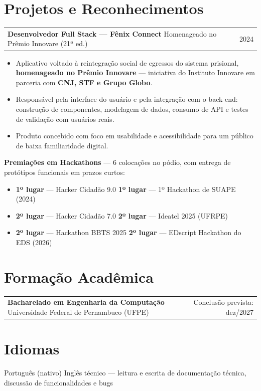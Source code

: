 \documentclass[a4paper,10.5pt]{article}
\makeatletter
\newcommand{\cargo}[3]{%
  \vspace{2pt}
  \begin{tabularx}{\textwidth}{@{}Xr@{}}
    \textbf{#1} \textnormal{\textbar{} #2} & \textcolor{muted}{#3}
  \end{tabularx}%
  \vspace{1pt}
}
\makeatother
\begin{document}
\section{Projetos e Reconhecimentos}

\cargo{Desenvolvedor Full Stack --- Fênix Connect}{Homenageado no Prêmio Innovare (21ª ed.)}{2024}
\begin{itemize}
  \item Aplicativo voltado à reintegração social de egressos do sistema prisional, \textbf{homenageado no Prêmio Innovare} --- iniciativa do Instituto Innovare em parceria com \textbf{CNJ, STF e Grupo Globo}.
  \item Responsável pela interface do usuário e pela integração com o back-end: construção de componentes, modelagem de dados, consumo de API e testes de validação com usuários reais.
  \item Produto concebido com foco em usabilidade e acessibilidade para um público de baixa familiaridade digital.
\end{itemize}

\textbf{Premiações em Hackathons} --- 6 colocações no pódio, com entrega de protótipos funcionais em prazos curtos:
\begin{itemize}
  \item \textbf{1º lugar} --- Hacker Cidadão 9.0 \textbar{} \textbf{1º lugar} --- 1º Hackathon de SUAPE (2024)
  \item \textbf{2º lugar} --- Hacker Cidadão 7.0 \textbar{} \textbf{2º lugar} --- Ideatel 2025 (UFRPE)
  \item \textbf{2º lugar} --- Hackathon BBTS 2025 \textbar{} \textbf{2º lugar} --- EDscript Hackathon do EDS (2026)
\end{itemize}

\section{Formação Acadêmica}
\cargo{Bacharelado em Engenharia da Computação}{Universidade Federal de Pernambuco (UFPE)}{Conclusão prevista: dez/2027}

\section{Idiomas}
Português (nativo) \textbar{} Inglês técnico --- leitura e escrita de documentação técnica, discussão de funcionalidades e bugs
\end{document}
